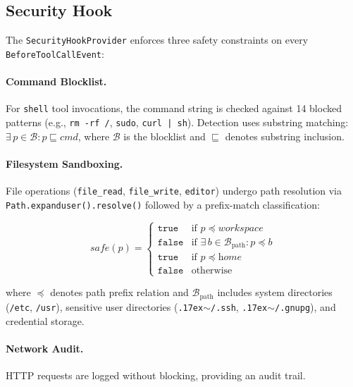 \documentclass[9pt,twocolumn,letterpaper]{extarticle}
\begin{document}
\subsection{Security Hook}

The \texttt{SecurityHookProvider} enforces three safety constraints on every \texttt{BeforeToolCallEvent}:

\paragraph{Command Blocklist.}
For \texttt{shell} tool invocations, the command string is checked against 14 blocked patterns (e.g., \texttt{rm -rf /}, \texttt{sudo}, \texttt{curl | sh}).
Detection uses substring matching: $\exists\, p \in \mathcal{B} : p \sqsubseteq \textit{cmd}$, where $\mathcal{B}$ is the blocklist and $\sqsubseteq$ denotes substring inclusion.

\paragraph{Filesystem Sandboxing.}
File operations (\texttt{file\_read}, \texttt{file\_write}, \texttt{editor}) undergo path resolution via \texttt{Path.expanduser().resolve()} followed by a prefix-match classification:

\begin{equation}
\textit{safe}(p) = \begin{cases}
\texttt{true} & \text{if } p \preceq \textit{workspace} \\
\texttt{false} & \text{if } \exists\, b \in \mathcal{B}_{\text{path}} : p \preceq b \\
\texttt{true} & \text{if } p \preceq \textit{home} \\
\texttt{false} & \text{otherwise}
\end{cases}
\label{eq:sandbox}
\end{equation}

\noindent where $\preceq$ denotes path prefix relation and $\mathcal{B}_{\text{path}}$ includes system directories (\texttt{/etc}, \texttt{/usr}), sensitive user directories (\texttt{\raise.17ex\hbox{$\scriptstyle\sim$}/.ssh}, \texttt{\raise.17ex\hbox{$\scriptstyle\sim$}/.gnupg}), and credential storage.

\paragraph{Network Audit.}
HTTP requests are logged without blocking, providing an audit trail.
\end{document}
